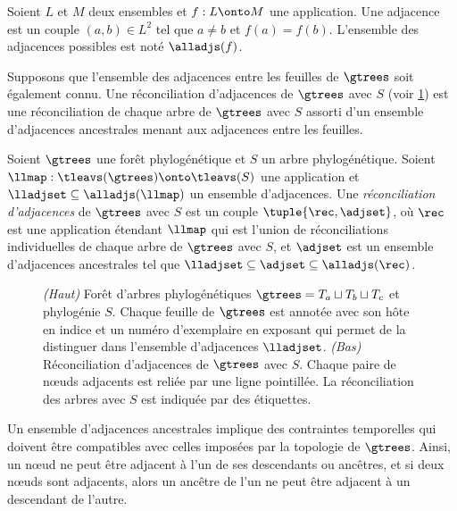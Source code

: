 \begin{definition}[Adjacence]\label{definition:adj}
    Soient \(L\) et \(M\) deux ensembles et \(f : L \onto M\) une application.
    Une adjacence est un couple \((a, b) \in L^2\) tel que \(a \neq b\) et \(f(a) = f(b)\).
    L’ensemble des adjacences possibles est noté \(\alladjs(f)\).
\end{definition}

Supposons que l’ensemble des adjacences entre les feuilles de \(\gtrees\) soit également connu.
Une réconciliation d’adjacences de \(\gtrees\) avec \(S\) (voir \cref{figure:adj-rec}) est une réconciliation de chaque arbre de \(\gtrees\) avec \(S\) assorti d’un ensemble d’adjacences ancestrales menant aux adjacences entre les feuilles.

\begin{definition}\label{definition:adjrec}
    Soient \(\gtrees\) une forêt phylogénétique et \(S\) un arbre phylogénétique.
    Soient \(\llmap : \tleavs(\gtrees) \onto \tleavs(S)\) une application et \(\lladjset \subseteq \alladjs(\llmap)\) un ensemble d’adjacences.
    Une \emph{réconciliation d’adjacences} de \(\gtrees\) avec \(S\) est un couple \(\tuple{\rec, \adjset}\),
    où \(\rec\) est une application étendant \(\llmap\) qui est l’union de réconciliations individuelles de chaque arbre de \(\gtrees\) avec \(S\),
    et \(\adjset\) est un ensemble d’adjacences ancestrales tel que \(\lladjset \subseteq \adjset \subseteq \alladjs(\rec)\).
\end{definition}

\begin{figure}[htb]
    \capstart
    \centering
    
    \caption{
        \emph{(Haut)}
        Forêt d’arbres phylogénétiques \(\gtrees = T_a \sqcup T_b \sqcup T_c\)
        et phylogénie \(S\).
        Chaque feuille de \(\gtrees\) est annotée avec son hôte en indice
        et un numéro d’exemplaire en exposant qui permet de la distinguer dans l’ensemble d’adjacences \(\lladjset\).
        \emph{(Bas)}
        Réconciliation d’adjacences de \(\gtrees\) avec \(S\).
        Chaque paire de nœuds adjacents est reliée par une ligne pointillée.
        La réconciliation des arbres avec \(S\) est indiquée par des étiquettes.
    }
    \label{figure:adj-rec}
\end{figure}

Un ensemble d’adjacences ancestrales implique des contraintes temporelles qui doivent être compatibles avec celles imposées par la topologie de \(\gtrees\).
Ainsi, un nœud ne peut être adjacent à l’un de ses descendants ou ancêtres, et si deux nœuds sont adjacents, alors un ancêtre de l’un ne peut être adjacent à un descendant de l’autre.

